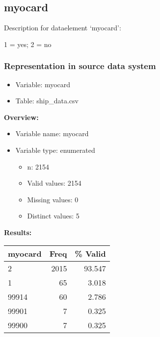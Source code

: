 \documentclass[
]{article}
\providecommand{\tightlist}{%
  \setlength{\itemsep}{0pt}\setlength{\parskip}{0pt}}
\begin{document}
\newpage

\hypertarget{myocard}{%
\subsection{myocard}\label{myocard}}

Description for dataelement `myocard':

1 = yes; 2 = no

\hypertarget{representation-in-source-data-system-17}{%
\subsubsection{\texorpdfstring{Representation in \textbf{source} data
system}{Representation in source data system}}\label{representation-in-source-data-system-17}}

\begin{itemize}
\tightlist
\item
  Variable: myocard
\item
  Table: ship\_data.csv
\end{itemize}

\textbf{Overview:}

\begin{itemize}
\tightlist
\item
  Variable name: myocard
\item
  Variable type: enumerated

  \begin{itemize}
  \tightlist
  \item
    n: 2154
  \item
    Valid values: 2154
  \item
    Missing values: 0
  \item
    Distinct values: 5
  \end{itemize}
\end{itemize}

\textbf{Results:}\\

\begin{table}[H]
\centering
\begin{tabular}{l|r|r}
\hline
\textbf{myocard} & \textbf{Freq} & \textbf{\% Valid}\\
\hline
2 & 2015 & 93.547\\
\hline
1 & 65 & 3.018\\
\hline
99914 & 60 & 2.786\\
\hline
99901 & 7 & 0.325\\
\hline
99900 & 7 & 0.325\\
\hline
\end{tabular}
\end{table}
\end{document}
